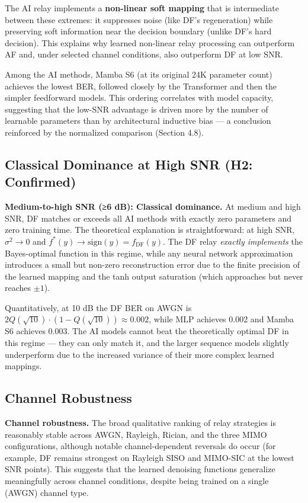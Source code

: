 \documentclass[
  english,
  12pt,
  12pt,
  a4paper,
  oneside]{report}
\begin{document}
The AI relay implements a \textbf{non-linear soft mapping} that is intermediate between these extremes: it suppresses noise (like DF's regeneration) while preserving soft information near the decision boundary (unlike DF's hard decision). This explains why learned non-linear relay processing can outperform AF and, under selected channel conditions, also outperform DF at low SNR.

Among the AI methods, Mamba S6 (at its original 24K parameter count) achieves the lowest BER, followed closely by the Transformer and then the simpler feedforward models. This ordering correlates with model capacity, suggesting that the low-SNR advantage is driven more by the number of learnable parameters than by architectural inductive bias --- a conclusion reinforced by the normalized comparison (Section 4.8).

\subsection{Classical Dominance at High SNR (H2: Confirmed)}\label{sec:classical-dominance-at-high-snr-h2-confirmed}

\textbf{Medium-to-high SNR (≥6 dB): Classical dominance.} At medium and high SNR, DF matches or exceeds all AI methods with exactly zero parameters and zero training time. The theoretical explanation is straightforward: at high SNR, \(\sigma^2 \to 0\) and \(f^*(y) \to \text{sign}(y) = f_{\text{DF}}(y)\). The DF relay \emph{exactly implements} the Bayes-optimal function in this regime, while any neural network approximation introduces a small but non-zero reconstruction error due to the finite precision of the learned mapping and the tanh output saturation (which approaches but never reaches \(\pm 1\)).

Quantitatively, at 10 dB the DF BER on AWGN is \(2Q(\sqrt{10}) \cdot (1 - Q(\sqrt{10})) \approx 0.002\), while MLP achieves 0.002 and Mamba S6 achieves 0.003. The AI models cannot beat the theoretically optimal DF in this regime --- they can only match it, and the larger sequence models slightly underperform due to the increased variance of their more complex learned mappings.

\subsection{Channel Robustness}\label{sec:channel-robustness}

\textbf{Channel robustness.} The broad qualitative ranking of relay strategies is reasonably stable across AWGN, Rayleigh, Rician, and the three MIMO configurations, although notable channel-dependent reversals do occur (for example, DF remains strongest on Rayleigh SISO and MIMO-SIC at the lowest SNR points). This suggests that the learned denoising functions generalize meaningfully across channel conditions, despite being trained on a single (AWGN) channel type.
\end{document}
